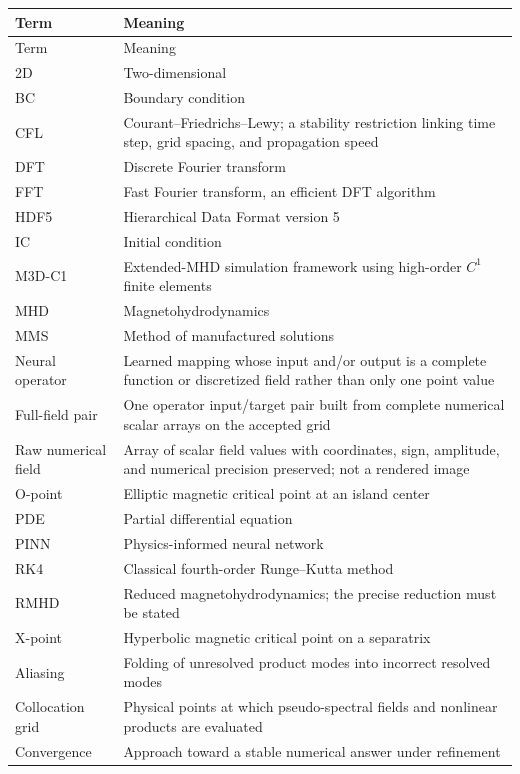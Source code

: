 \documentclass[11pt]{article}
\begin{document}
\begin{longtable}{p{}p{}}
\toprule
Term & Meaning \\
\midrule
\endfirsthead
\toprule
Term & Meaning \\
\midrule
\endhead
2D & Two-dimensional \\
BC & Boundary condition \\
CFL & Courant--Friedrichs--Lewy; a stability restriction linking time step, grid spacing, and propagation speed \\
DFT & Discrete Fourier transform \\
FFT & Fast Fourier transform, an efficient DFT algorithm \\
HDF5 & Hierarchical Data Format version 5 \\
IC & Initial condition \\
M3D-C1 & Extended-MHD simulation framework using high-order $C^1$ finite elements \\
MHD & Magnetohydrodynamics \\
MMS & Method of manufactured solutions \\
Neural operator & Learned mapping whose input and/or output is a complete function or discretized field rather than only one point value \\
Full-field pair & One operator input/target pair built from complete numerical scalar arrays on the accepted grid \\
Raw numerical field & Array of scalar field values with coordinates, sign, amplitude, and numerical precision preserved; not a rendered image \\
O-point & Elliptic magnetic critical point at an island center \\
PDE & Partial differential equation \\
PINN & Physics-informed neural network \\
RK4 & Classical fourth-order Runge--Kutta method \\
RMHD & Reduced magnetohydrodynamics; the precise reduction must be stated \\
X-point & Hyperbolic magnetic critical point on a separatrix \\
Aliasing & Folding of unresolved product modes into incorrect resolved modes \\
Collocation grid & Physical points at which pseudo-spectral fields and nonlinear products are evaluated \\
Convergence & Approach toward a stable numerical answer under refinement \\

\end{longtable}
\end{document}
